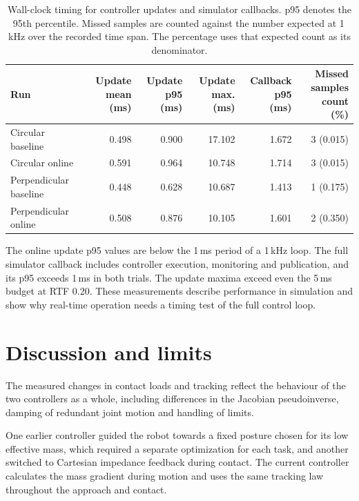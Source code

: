 \documentclass[11pt,a4paper]{article}
\begin{document}
\begin{table}[htbp]
\centering
\small
\setlength{\tabcolsep}{5pt}
\begin{tabular}{lrrrrr}
\toprule
Run & \shortstack{Update mean\\(ms)} & \shortstack{Update p95\\(ms)}
& \shortstack{Update max.\\(ms)} & \shortstack{Callback p95\\(ms)}
& \shortstack{Missed samples\\count (\%)}\\
\midrule
Circular baseline & 0.498 & 0.900 & 17.102 & 1.672 & 3 (0.015)\\
Circular online & 0.591 & 0.964 & 10.748 & 1.714 & 3 (0.015)\\
Perpendicular baseline & 0.448 & 0.628 & 10.687 & 1.413 & 1 (0.175)\\
Perpendicular online & 0.508 & 0.876 & 10.105 & 1.601 & 2 (0.350)\\
\bottomrule
\end{tabular}
\caption{Wall-clock timing for controller updates and simulator callbacks.
p95 denotes the 95th percentile. Missed samples are counted against the
number expected at 1\,kHz over the recorded time span. The percentage
uses that expected count as its denominator.}
\label{tab:timing}
\end{table}

The online update p95 values are below the 1\,ms period of a 1\,kHz
loop. The full simulator callback includes controller execution,
monitoring and publication, and its p95 exceeds 1\,ms in both trials.
The update maxima exceed even the 5\,ms budget at RTF 0.20. These
measurements describe performance in simulation and show why real-time
operation needs a timing test of the full control loop.

\section{Discussion and limits}
The measured changes in contact loads and tracking reflect the behaviour
of the two controllers as a whole, including differences in the Jacobian
pseudoinverse, damping of redundant joint motion and handling of limits.

One earlier controller guided the robot towards a fixed posture chosen for
its low effective mass, which required a separate optimization for each
task, and another switched to Cartesian impedance feedback during contact.
The current controller calculates the mass gradient during motion and uses
the same tracking law throughout the approach and contact.
\end{document}
